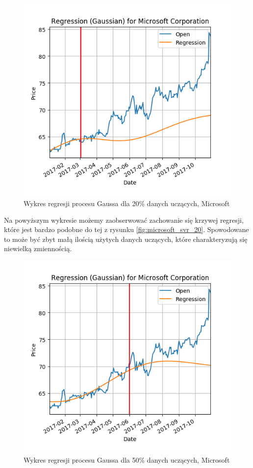 \begin{figure}[h!]
\centering
\includegraphics[width=150mm]{pictures/plots/microsoft_gpr_20.png}
\caption{Wykres regresji procesu Gaussa dla 20\% danych uczących, Microsoft}
\label{fig:microsoft_gpr_20}
\end{figure}

Na powyższym wykresie możemy zaobserwować zachowanie się krzywej regresji, które jest bardzo podobne do tej z rysunku \ref{fig:microsoft_svr_20}.
Spowodowane to może być zbyt małą ilością użytych danych uczących, które charakteryzują się niewielką zmiennością.\\

\begin{figure}[h!]
\centering
\includegraphics[width=150mm]{pictures/plots/microsoft_gpr_50.png}
\caption{Wykres regresji procesu Gaussa dla 50\% danych uczących, Microsoft}
\label{fig:microsoft_gpr_50}
\end{figure}

